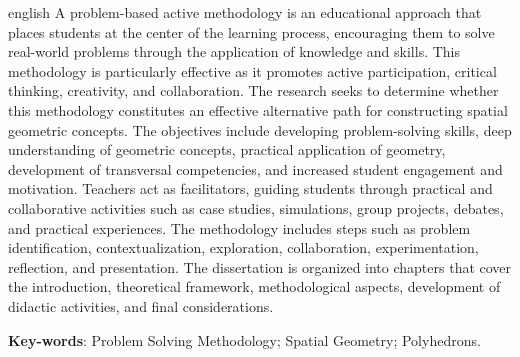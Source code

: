 
\begin{resumo}[Abstract]
	\begin{otherlanguage*}{english}
		A problem-based active methodology is an educational approach that places students at the center of the learning process, encouraging them to solve real-world problems through the application of knowledge and skills. This methodology is particularly effective as it promotes active participation, critical thinking, creativity, and collaboration. The research seeks to determine whether this methodology constitutes an effective alternative path for constructing spatial geometric concepts. The objectives include developing problem-solving skills, deep understanding of geometric concepts, practical application of geometry, development of transversal competencies, and increased student engagement and motivation. Teachers act as facilitators, guiding students through practical and collaborative activities such as case studies, simulations, group projects, debates, and practical experiences. The methodology includes steps such as problem identification, contextualization, exploration, collaboration, experimentation, reflection, and presentation. The dissertation is organized into chapters that cover the introduction, theoretical framework, methodological aspects, development of didactic activities, and final considerations.

		\vspace{\onelineskip}

		\noindent
		\textbf{Key-words}: Problem Solving Methodology; Spatial Geometry; Polyhedrons.
	\end{otherlanguage*}
\end{resumo}
